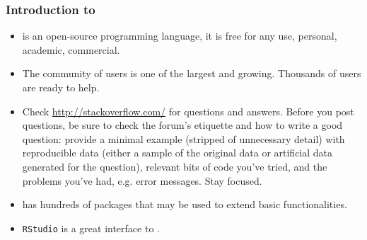 
\begin{frame}[label=TitlePage]
\maketitle%
\end{frame}


\begin{frame}[fragile]
\frametitle{Introduction to \Rlogo}
\begin{itemize}
\item \Rlogo is an open-source programming language, it is free for any use, personal, academic, commercial. 
\item The community of \Rlogo users is one of the largest and growing. Thousands of users are ready to help. 
\item Check \url{http://stackoverflow.com/} for questions and answers. Before you post questions, be sure to check the forum's etiquette and how to write a good question: provide a minimal example (stripped of unnecessary detail) with reproducible data (either a sample of the original data or artificial data generated for the question), relevant bits of code you've tried, and the problems you've had, e.g. error messages. Stay focused. 
\item \Rlogo has hundreds of packages that may be used to extend basic functionalities.
\item \texttt{RStudio} is a great interface to \Rlogo.
\end{itemize}
\end{frame}


